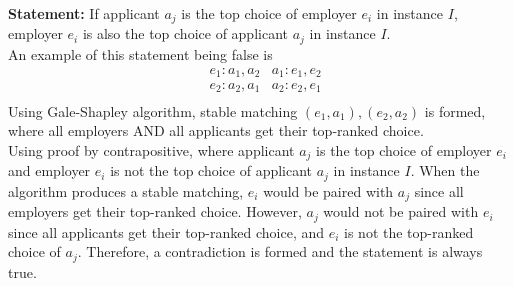 \documentclass[11pt,fleqn]{exam}
\newif\ifsolutions\solutionsfalse
\newenvironment{soln}{\color{solnblue}}{}
\begin{document}
\begin{questions}
  \noindent
  {\bf Statement:}
  If applicant $a_j$ is the top choice of employer $e_i$ in instance $I$, employer $e_i$ is also the top choice of applicant $a_j$ in instance $I$.
  \\
  \begin{soln}
    An example of this statement being false is
    \begin{align*}
        & e_1: a_1, a_2 & a_1: e_1, e_2 \\
        & e_2: a_2, a_1 & a_2: e_2, e_1 \\
    \end{align*}
    Using Gale-Shapley algorithm, stable matching $(e_1, a_1), (e_2, a_2)$ is formed, where all employers AND all applicants get their top-ranked choice. \\
    Using proof by contrapositive, where applicant $a_j$ is the top choice of employer $e_i$ and employer $e_i$ is not the top choice of applicant $a_j$ in instance $I$. When the algorithm produces a stable matching, $e_i$ would be paired with $a_j$ since all employers get their top-ranked choice. However, $a_j$ would not be paired with $e_i$ since all applicants get their top-ranked choice, and $e_i$ is not the top-ranked choice of $a_j$. Therefore, a contradiction is formed and the statement is always true.
  \end{soln}
  \ifsolutions
    
  \else
  \fi
\end{questions}

\clearpage

\end{document}
